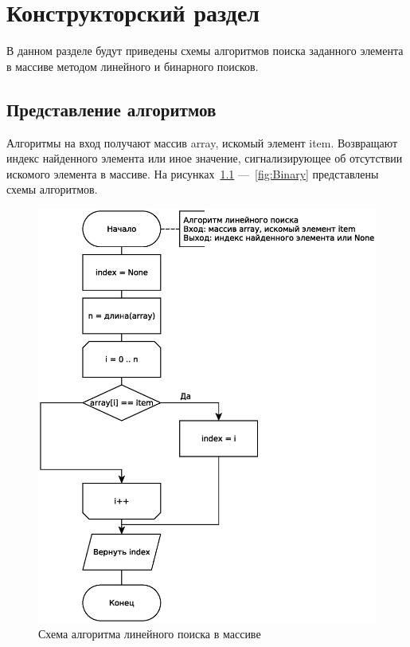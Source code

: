 \chapter{Конструкторский раздел}
В данном разделе будут приведены схемы алгоритмов поиска заданного элемента в массиве методом линейного и бинарного поисков.

\section{Представление алгоритмов}

Алгоритмы на вход получают массив array, искомый элемент item. Возвращают индекс найденного элемента или иное значение, сигнализирующее об отсутствии искомого элемента в массиве. На рисунках~\ref{fig:Liniar} ---~\ref{fig:Binary} представлены схемы алгоритмов.

\begin{figure}[h]
	\centering
	\includegraphics[scale=0.65]{img/liniar_search.eps}
	\caption{Схема алгоритма линейного поиска в массиве}
	\label{fig:Liniar}
\end{figure}

